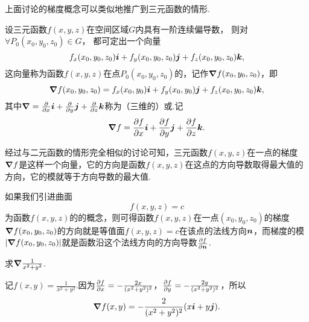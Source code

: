 上面讨论的梯度概念可以类似地推广到三元函数的情形.
\begin{definition}
设三元函数\(f(x,y,z)\)在空间区域\(G\)内具有一阶连续偏导数，
则对\(\forall P_0(x_0,y_0,z_0) \in G\)，
都可定出一个向量\[
f_x(x_0,y_0,z_0) \boldsymbol{i} + f_y(x_0,y_0,z_0) \boldsymbol{j} + f_z(x_0,y_0,z_0) \boldsymbol{k},
\]这向量称为函数\(f(x,y,z)\)在点\(P_0(x_0,y_0,z_0)\)的，记作\(\grad f(x_0,y_0,z_0)\)，即\[
\grad f(x_0,y_0,z_0)
= f_x(x_0,y_0) \boldsymbol{i} + f_y(x_0,y_0) \boldsymbol{j} + f_z(x_0,y_0,z_0) \boldsymbol{k},
\]其中\(\grad = \pdv{x} \boldsymbol{i} + \pdv{y} \boldsymbol{j} + \pdv{z} \boldsymbol{k}\)称为（三维的）或.记\[
\grad f = \pdv{f}{x} \boldsymbol{i} + \pdv{f}{y} \boldsymbol{j} + \pdv{f}{z} \boldsymbol{k}.
\]
\end{definition}

经过与二元函数的情形完全相似的讨论可知，三元函数\(f(x,y,z)\)在一点的梯度\(\grad f\)是这样一个向量，它的方向是函数\(f(x,y,z)\)在这点的方向导数取得最大值的方向，它的模就等于方向导数的最大值.

如果我们引进曲面\[
f(x,y,z) = c
\]为函数\(f(x,y,z)\)的的概念，则可得函数\(f(x,y,z)\)在一点\((x_0,y_0,z_0)\)的梯度\(\grad f(x_0,y_0,z_0)\)的方向就是等值面\(f(x,y,z) = c\)在该点的法线方向\(\boldsymbol{n}\)，而梯度的模\(\abs{\grad f(x_0,y_0,z_0)}\)就是函数沿这个法线方向的方向导数\(\pdv{f}{\boldsymbol{n}}\).

\begin{example}
求\(\grad \frac{1}{x^2+y^2}\).
\begin{solution}
记\(f(x,y) = \frac{1}{x^2+y^2}\).因为\(\pdv{f}{x} = -\frac{2x}{(x^2+y^2)^2}\)，\(\pdv{f}{y} = -\frac{2y}{(x^2+y^2)^2}\)，所以\[
\grad f(x,y) = -\frac{2}{(x^2+y^2)^2} (x \boldsymbol{i} + y \boldsymbol{j}).
\]
\end{solution}
\end{example}

